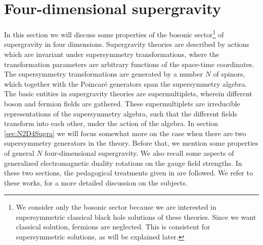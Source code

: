 \documentclass[12pt,twoside]{book}
\begin{document}


\section{Four-dimensional supergravity}

In this section we will discuss some properties of the bosonic sector\footnote{
We consider only the bosonic sector because we are interested in supersymmetric classical black hole solutions of these theories. Since we want classical solution, fermions are neglected. This is consistent for supersymmetric solutions, as will be explained later.
} of supergravity in four dimensions. Supergravity theories are described by actions which are invariant under supersymmetry transformations, where the transformation parameters are arbitrary functions of the space-time coordinates. The supersymmetry transformations are generated by a number $N$ of spinors, which together with the Poincar\'e generators span the supersymmetry algebra. The basic entities in supergravity theories are supermultiplets, wherein different boson and fermion fields are gathered. These supermultiplets are irreducible representations of the supersymmetry algebra, such that the different fields transform into each other, under the action of the algebra. In section \ref{sec:N2D4Sugra} we will focus somewhat more on the case when there are two supersymmetry generators in the theory. Before that, we mention some properties of general $N$ four-dimensional supergravity. We also recall some aspects of generalized electromagnetic duality rotations on the gauge field strengths. In these two sections, the pedagogical treatments given in \cite{Fre:1996qr,DAuria:uq,Mohaupt:2001kx} are followed. We refer to these works, for a more detailed discussion on the subjects.\\
\end{document}
